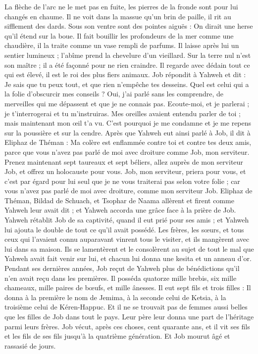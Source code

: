 \begin{multicols}{2}
La flèche de l'arc ne le met pas en fuite, les pierres de la fronde sont pour lui changés en chaume.
Il ne voit dans la massue qu'un brin de paille, il rit au sifflement des dards.
Sous son ventre sont des pointes aiguës : On dirait une herse qu'il étend sur la boue.
Il fait bouillir les profondeurs de la mer comme une chaudière, il la traite comme un vase rempli de parfums.
Il laisse après lui un sentier lumineux ; l'abîme prend la chevelure d'un vieillard.
Sur la terre nul n'est son maître ; il a été façonné pour ne rien craindre.
Il regarde avec dédain tout ce qui est élevé, il est le roi des plus fiers animaux.
\VerseOne{}Job répondit à Yahweh et dit :
Je sais que tu peux tout, et que rien n'empêche tes desseins.
Quel est celui qui a la folie d'obscurcir mes conseils ? Oui, j'ai parlé sans les comprendre, de merveilles qui me dépassent et que je ne connais pas.
Ecoute-moi, et je parlerai ; je t'interrogerai et tu m'instruiras.
Mes oreilles avaient entendu parler de toi ; mais maintenant mon œil t'a vu.
C'est pourquoi je me condamne et je me repens sur la poussière et sur la cendre.
Après que Yahweh eut ainsi parlé à Job, il dit à Eliphaz de Théman : Ma colère est enflammée contre toi et contre tes deux amis, parce que vous n'avez pas parlé de moi avec droiture comme Job, mon serviteur.
Prenez maintenant sept taureaux et sept béliers, allez auprès de mon serviteur Job, et offrez un holocauste pour vous. Job, mon serviteur, priera pour vous, et c'est par égard pour lui seul que je ne vous traiterai pas selon votre folie ; car vous n'avez pas parlé de moi avec droiture, comme mon serviteur Job.
Eliphaz de Théman, Bildad de Schuach, et Tsophar de Naama allèrent et firent comme Yahweh leur avait dit ; et Yahweh accorda une grâce face à la prière de Job.
Yahweh rétablit Job de sa captivité, quand il eut prié pour ses amis ; et Yahweh lui ajouta le double de tout ce qu'il avait possédé.
Les frères, les sœurs, et tous ceux qui l'avaient connu auparavant vinrent tous le visiter, et ils mangèrent avec lui dans sa maison. Ils se lamentèrent et le consolèrent au sujet de tout le mal que Yahweh avait fait venir sur lui, et chacun lui donna une kesita et un anneau d'or.
Pendant ses dernières années, Job reçut de Yahweh plus de bénédictions qu'il n'en avait reçu dans les premières. Il posséda quatorze mille brebis, six mille chameaux, mille paires de bœufs, et mille ânesses.
Il eut sept fils et trois filles :
Il donna à la première le nom de Jemima, à la seconde celui de Ketsia, à la troisième celui de Kéren-Happuc.
Et il ne se trouvait pas de femmes aussi belles que les filles de Job dans tout le pays. Leur père leur donna une part de l'héritage parmi leurs frères.
Job vécut, après ces choses, cent quarante ans, et il vit ses fils et les fils de ses fils jusqu'à la quatrième génération.
Et Job mourut âgé et rassasié de jours.
\PPE{}
\end{multicols}
